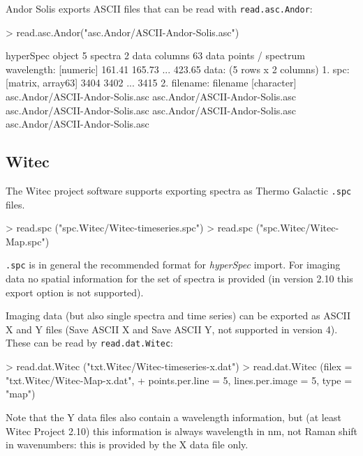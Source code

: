 \documentclass[english, a4paper, 10pt, headings=small, DIV11]{scrartcl}
\renewenvironment{Schunk}{\vspace{0pt}\begin{small}}{\end{small}\vspace{0pt}}
\newcommand{\Rfunction}[2][]{\texorpdfstring{\nohyphens{#1\texttt{#2}}}{#2}}
\newcommand{\phy}{\texorpdfstring{\nohyphens{\textit{hyperSpec}}}{hyperSpec}\xspace}
\begin{document}
Andor Solis exports ASCII files that can be read with \Rfunction{read.asc.Andor}:
\begin{Schunk}
\begin{Sinput}
> read.asc.Andor("asc.Andor/ASCII-Andor-Solis.asc")
\end{Sinput}
\begin{Soutput}
hyperSpec object
   5 spectra
   2 data columns
   63 data points / spectrum
wavelength:  [numeric] 161.41 165.73 ... 423.65 
data:  (5 rows x 2 columns)
   1. spc:  [matrix, array63] 3404 3402 ... 3415 
   2. filename: filename [character] asc.Andor/ASCII-Andor-Solis.asc asc.Andor/ASCII-Andor-Solis.asc asc.Andor/ASCII-Andor-Solis.asc asc.Andor/ASCII-Andor-Solis.asc asc.Andor/ASCII-Andor-Solis.asc 
\end{Soutput}
\end{Schunk}

\subsection{Witec}
\label{sec:read.txt.Witec}

The Witec project software supports exporting spectra as Thermo Galactic \texttt{.spc} files.
\begin{Schunk}
\begin{Sinput}
> read.spc ("spc.Witec/Witec-timeseries.spc")
> read.spc ("spc.Witec/Witec-Map.spc")
\end{Sinput}
\end{Schunk}
\texttt{.spc} is in general the recommended format for \phy import. For imaging data no spatial information for the set of spectra is provided (in version 2.10 this export option is not supported).

Imaging data (but also single spectra and time series) can be exported as ASCII X and Y files (Save ASCII X and Save ASCII Y, not supported in version 4). These can be read by \Rfunction{read.dat.Witec}:
\begin{Schunk}
\begin{Sinput}
> read.dat.Witec ("txt.Witec/Witec-timeseries-x.dat")
> read.dat.Witec (filex = "txt.Witec/Witec-Map-x.dat",
+                 points.per.line = 5, lines.per.image = 5, type = "map")
\end{Sinput}
\end{Schunk}
Note that the Y data files also contain a wavelength information, but (at least Witec Project 2.10) this information is always wavelength in nm, not Raman shift in wavenumbers: this is provided by the X data file only.
\end{document}
